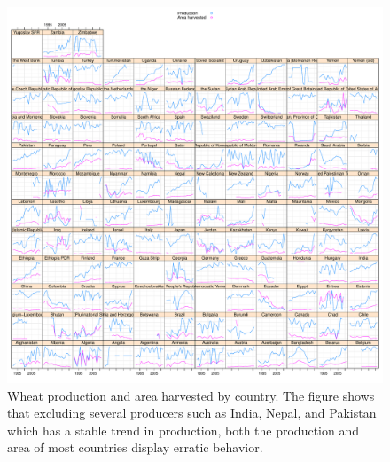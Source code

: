 \documentclass[nojss]{jss}\usepackage[]{graphicx}\usepackage[]{color}
\makeatletter
\def\maxwidth{ %
  \ifdim\Gin@nat@width>\linewidth
    \linewidth
  \else
    \Gin@nat@width
  \fi
}
\newenvironment{knitrout}{}{} %
\makeatother
\begin{document}
\begin{knitrout}
\color{fgcolor}\begin{figure}[!ht]


{\centering \includegraphics[width=\maxwidth]{figure/wheat-production-area-explore} 

}

\caption[Wheat production and area harvested by country]{Wheat production and area harvested by country. The figure shows that excluding several producers such as India, Nepal, and Pakistan which has a stable trend in production, both the production and area of most countries display erratic behavior.\label{fig:wheat-production-area-explore}}
\end{figure}


\end{knitrout}
\end{document}
